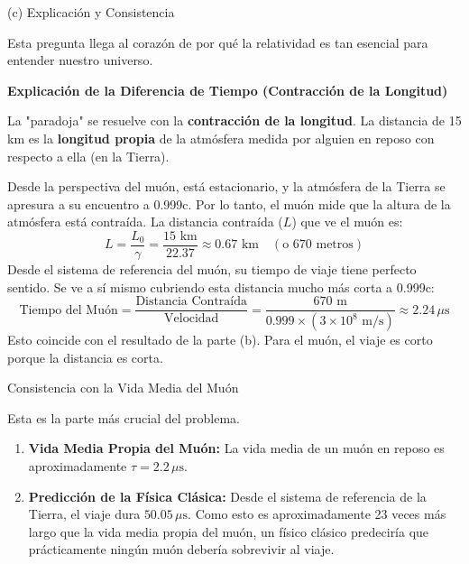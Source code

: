 \documentclass[11pt,a4paper]{article}
\begin{document}
\begin{itemize}
\textbf{}{(c) Explicación y Consistencia}

Esta pregunta llega al corazón de por qué la relatividad es tan esencial para entender nuestro universo.

\textbf{Explicación de la Diferencia de Tiempo (Contracción de la Longitud)}

La "paradoja" se resuelve con la \textbf{contracción de la longitud}. La distancia de 15 km es la \textbf{longitud propia} de la atmósfera medida por alguien en reposo con respecto a ella (en la Tierra).

Desde la perspectiva del muón, está estacionario, y la atmósfera de la Tierra se apresura a su encuentro a 0.999c. Por lo tanto, el muón mide que la altura de la atmósfera está contraída. La distancia contraída ($L$) que ve el muón es:
\[ L = \frac{L_0}{\gamma} = \frac{15 \text{ km}}{22.37} \approx 0.67 \text{ km} \quad (\text{o 670 metros}) \]
Desde el sistema de referencia del muón, su tiempo de viaje tiene perfecto sentido. Se ve a sí mismo cubriendo esta distancia mucho más corta a 0.999c:
\[ \text{Tiempo del Muón} = \frac{\text{Distancia Contraída}}{\text{Velocidad}} = \frac{670 \text{ m}}{0.999 \times (3 \times 10^8 \text{ m/s})} \approx 2.24 \, \mu\text{s} \]
Esto coincide con el resultado de la parte (b). Para el muón, el viaje es corto porque la distancia es corta.

\textbf{}{Consistencia con la Vida Media del Muón}

Esta es la parte más crucial del problema.
\begin{enumerate}
    \item \textbf{Vida Media Propia del Muón:} La vida media de un muón en reposo es aproximadamente $\tau = 2.2 \, \mu\text{s}$.

    \item \textbf{Predicción de la Física Clásica:} Desde el sistema de referencia de la Tierra, el viaje dura $50.05 \, \mu\text{s}$. Como esto es aproximadamente 23 veces más largo que la vida media propia del muón, un físico clásico predeciría que prácticamente ningún muón debería sobrevivir al viaje.


\end{enumerate}
\end{itemize}
\end{document}
